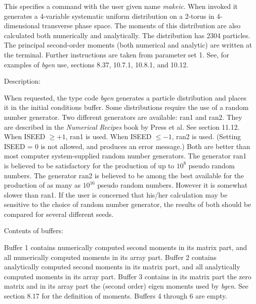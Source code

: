 This specifies a command with the user given name {\em makeic}.  When invoked it generates a 4-variable systematic uniform distribution on a 2-torus in 4-dimensional transverse phase space.  The moments of this distribution are also calculated both numerically and analytically.  The distribution has 2304 particles.  The principal second-order moments (both numerical and analytic) are written at the terminal.  Further instructions are taken from parameter set 1.  See, for examples of {\em bgen} use, sections 8.37, 10.7.1, 10.8.1, and 10.12.

\vspace{5mm}
Description:
\vspace{2mm}

When requested, the type code {\em bgen} generates a particle distribution and places it in the initial conditions buffer.  Some distributions require the use of a random number generator.  Two different generators are available:  ran1
and ran2.  They are described in the {\em Numerical Recipes} book by Press et
al.  See section 11.12.  When ISEED $\geq +1$, ran1 is used.
When ISEED $\leq -1$, ran2 is used.  (Setting ISEED = 0 is not allowed,
and produces an error message.)  Both are better than most computer
system-supplied random number generators.  The generator ran1 is believed
to be satisfactory for the production of up to $10^8$ pseudo random numbers.  The generator ran2
is believed to be among the best available for the production of as many
as $ 10^{16}$ pseudo random numbers.  However it is somewhat slower than
ran1.  If the user is concerned that
his/her calculation may be sensitive to the choice of random number
generator, the results of both should be compared for several different
seeds. 

\vspace{5mm}

Contents of buffers:
\vspace{2mm}

Buffer 1 contains numerically computed second moments in its matrix part,
and all numerically computed moments in its array part.  Buffer 2 contains analytically
computed second moments in its matrix part, and all analytically computed moments in its array part.
Buffer 3 contains in its matrix part the zero matrix and in its array part the (second order) eigen moments used
by {\em bgen}.  See section 8.17 for the definition of moments.  Buffers 4 through 6 are empty.

\newpage
